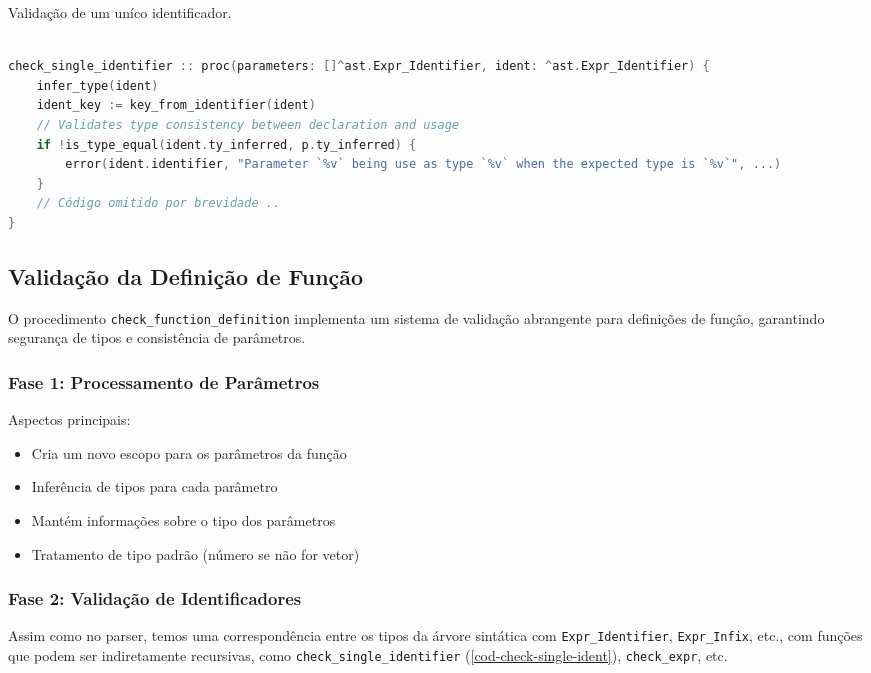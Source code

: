 \begin{codigo}[htb]
    \caption{\small Validação de um uníco identificador. }
    \label{cod-check-single-ident}
\begin{lstlisting}[language=C, numbers=none, frame=none, inputencoding=latin1]

check_single_identifier :: proc(parameters: []^ast.Expr_Identifier, ident: ^ast.Expr_Identifier) {
    infer_type(ident)
    ident_key := key_from_identifier(ident)
    // Validates type consistency between declaration and usage
    if !is_type_equal(ident.ty_inferred, p.ty_inferred) {
        error(ident.identifier, "Parameter `%v` being use as type `%v` when the expected type is `%v`", ...)
    }
    // Código omitido por brevidade ..
}
\end{lstlisting}
\end{codigo}



\subsection{Validação da Definição de Função}
O procedimento \verb`check_function_definition` implementa um sistema de validação abrangente para definições de função, garantindo segurança de tipos e consistência de parâmetros.

\subsubsection{Fase 1: Processamento de Parâmetros}
Aspectos principais:
\begin{itemize}
    \item Cria um novo escopo para os parâmetros da função
    \item Inferência de tipos para cada parâmetro
    \item Mantém informações sobre o tipo dos parâmetros
    \item Tratamento de tipo padrão (número se não for vetor)
\end{itemize}

\subsubsection{Fase 2: Validação de Identificadores}
Assim como no parser, temos uma correspondência entre os tipos da árvore sintática com \verb|Expr_Identifier|, \verb|Expr_Infix|, etc., com funções que podem ser indiretamente recursivas, como \verb|check_single_identifier| (\autoref{cod-check-single-ident}), \verb|check_expr|, etc.

